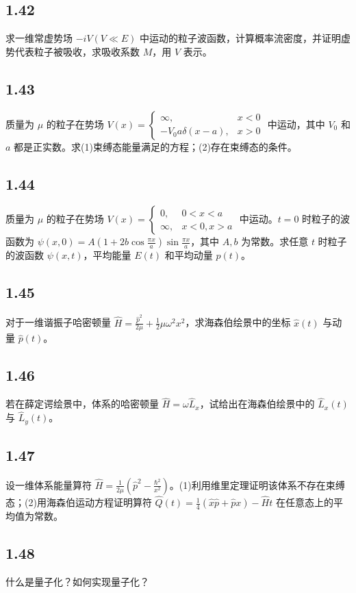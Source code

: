 \subsection{1.42}
求一维常虚势场 $-iV(V \ll E)$ 中运动的粒子波函数，计算概率流密度，并证明虚势代表粒子被吸收，求吸收系数 $M$，用 $V$ 表示。

\subsection{1.43}
质量为 $\mu$ 的粒子在势场 $V(x) = \begin{cases}
\infty, & x < 0 \\
-V_0 a \delta (x-a), & x > 0
\end{cases}$ 中运动，其中 $V_0$ 和 $a$ 都是正实数。求(1)束缚态能量满足的方程；(2)存在束缚态的条件。

\subsection{1.44}
质量为 $\mu$ 的粒子在势场 $V(x) = \begin{cases} 
0, & 0 < x < a \\ 
\infty, & x < 0, x > a 
\end{cases}$ 中运动。$t = 0$ 时粒子的波函数为 $\psi (x, 0) = A \left( 1 + 2b \cos \frac{\pi x}{a} \right) \sin \frac{\pi x}{a}$，其中 $A, b$ 为常数。求任意 $t$ 时粒子的波函数 $\psi (x, t)$，平均能量 $E(t)$ 和平均动量 $p(t)$。

\subsection{1.45}
对于一维谐振子哈密顿量 $\hat{H} = \frac{\hat{p}^2}{2\mu} + \frac{1}{2}\mu\omega^2 x^2$，求海森伯绘景中的坐标 $\hat{x}(t)$ 与动量 $\hat{p}(t)$。

\subsection{1.46}
若在薛定谔绘景中，体系的哈密顿量 $\hat{H} = \omega \hat{L}_x$，试给出在海森伯绘景中的 $\hat{L}_x(t)$ 与 $\hat{L}_y(t)$。

\subsection{1.47}
设一维体系能量算符 $\hat{H} = \frac{1}{2 \mu} \left( \hat{p}^2 - \frac{\hbar^2}{x^2} \right)$。(1)利用维里定理证明该体系不存在束缚态；(2)用海森伯运动方程证明算符 $\hat{Q}(t)=\frac{1}{4}(\hat{x}\hat{p}+\hat{p}x)-\hat{H}t$ 在任意态上的平均值为常数。

\subsection{1.48}
什么是量子化？如何实现量子化？